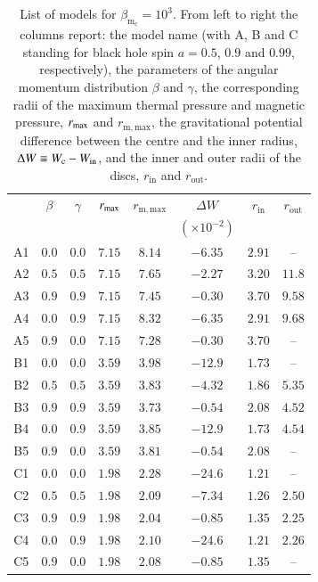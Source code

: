 \documentclass[referee]{aa}
\begin{document}
\begin{table}
\caption{List of models for $\beta_{\mathrm{m}_{\mathrm{c}}} = 10^{3}$. From left to right the columns report: the model name (with A, B and C standing for black hole spin $a = 0.5$, $0.9$ and $0.99$, respectively), the parameters of the angular momentum distribution $\beta$ and $\gamma$, the corresponding radii of the maximum thermal pressure and magnetic pressure, $r_{{\rm{max}}}$ and $r_{{\mathrm{m, max}}}$, the gravitational potential difference between the centre and the inner radius, $\Delta W\equiv W_{\rm c}-W_{\rm in}$, and the inner and outer radii of the discs, $r_{\mathrm{in}}$ and $r_{\mathrm{out}}$.}             
\label{table:1}      
\centering          
\begin{tabular}{c c c c  c c c c}
\hline\hline       
 & $\beta$ & $\gamma$ & $r_{\rm{max}}$ &  $r_{\mathrm{m, max}}$ & $\Delta W$               & $r_{\mathrm{in}}$ & $r_{\mathrm{out}}$ \\ 
 &              &                   &                          &                                        & $(\times 10^{-2})$     &                              &  \\
\hline           
A1 & $0.0$ & $0.0$ & $7.15$ &  $8.14$  & $-6.35$ & $2.91$ & -- \\ 
A2 & $0.5$ & $0.5$ & $7.15$ &  $7.65$  & $-2.27$ & $3.20$ & $11.8$\\ 
A3 & $0.9$ & $0.9$ & $7.15$ &  $7.45$  & $-0.30$ & $3.70$ &  $9.58$\\ 
A4 & $0.0$ & $0.9$ & $7.15$ &  $8.32$  & $-6.35$ & $2.91$ & $9.68$\\ 
A5 & $0.9$ & $0.0$ & $7.15$ &  $7.28$  & $-0.30$ & $3.70$ & --\\ 
 \hline 
B1 & $0.0$ & $0.0$ & $3.59$ &  $3.98$  & $-12.9$ & $1.73$ & -- \\ 
B2 & $0.5$ & $0.5$ & $3.59$ &  $3.83$  & $-4.32$ & $1.86$ & $5.35$\\ 
B3 & $0.9$ & $0.9$ & $3.59$ &  $3.73$  & $-0.54$ & $2.08$ & $4.52$\\ 
B4 & $0.0$ & $0.9$ & $3.59$ &  $3.85$  & $-12.9$ & $1.73$ & $4.54$\\ 
B5 & $0.9$ & $0.0$ & $3.59$ &  $3.81$  & $-0.54$ & $2.08$ & -- \\  
 \hline 
C1 & $0.0$ & $0.0$ & $1.98$ &  $2.28$  & $-24.6$ & $1.21$ & -- \\ 
C2 & $0.5$ & $0.5$ & $1.98$ &  $2.09$  & $-7.34$ & $1.26$ & $2.50$\\ 
C3 & $0.9$ & $0.9$ & $1.98$ &  $2.04$  & $-0.85$ & $1.35$ & $2.25$\\ 
C4 & $0.0$ & $0.9$ & $1.98$ &  $2.10$  & $-24.6$ & $1.21$ & $2.26$\\ 
C5 & $0.9$ & $0.0$ & $1.98$ &  $2.08$  & $-0.85$ & $1.35$ & --\\ 
\hline      
\end{tabular}
\end{table}
\end{document}
